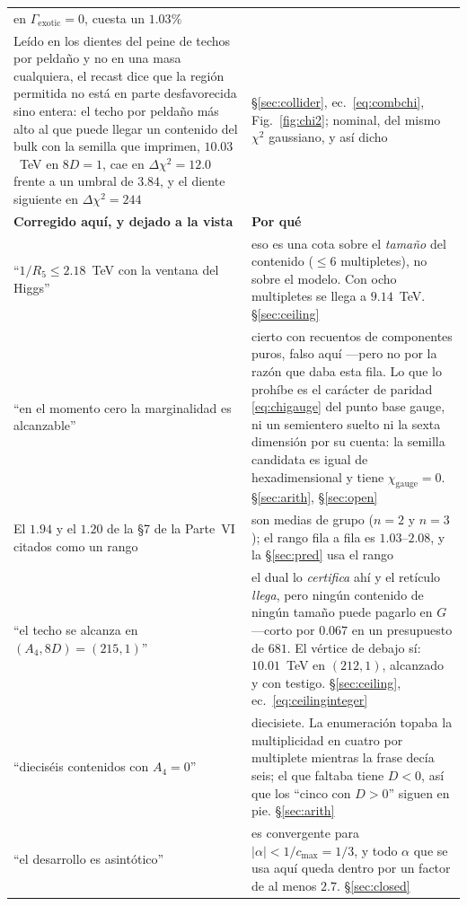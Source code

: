 \documentclass[11pt,a4paper]{article}
\begin{document}
\begin{longtable}{p{}p{}}
en $\Gamma_{\mathrm{exotic}}=0$, cuesta un $1.03\%$\\
Leído en los dientes del peine de techos por peldaño y no en una masa cualquiera, el recast dice que la
región permitida no está en parte desfavorecida sino entera: el techo por peldaño más alto al que
puede llegar un contenido del bulk con la semilla que \cite{KM25} imprimen, $10.03$~TeV en $8D=1$, cae en $\Delta\chi^2=12.0$ frente a un
umbral de $3.84$, y el diente siguiente en $\Delta\chi^2=244$ & \S\ref{sec:collider},
ec.~\eqref{eq:combchi}, Fig.~\ref{fig:chi2}; nominal, del mismo $\chi^2$ gaussiano, y así dicho\\
\midrule
\rowcolor{hdrblue!10}\textbf{Corregido aquí, y dejado a la vista} & \textbf{Por qué}\\
\midrule
``$1/R_5\le2.18$~TeV con la ventana del Higgs'' & eso es una cota sobre el \emph{tamaño} del
contenido ($\le6$ multipletes), no sobre el modelo. Con ocho multipletes se llega a $9.14$~TeV.
\S\ref{sec:ceiling}\\
``en el momento cero la marginalidad es alcanzable'' & cierto con recuentos de componentes puros,
falso aquí ---pero no por la razón que daba esta fila. Lo que lo prohíbe es el carácter de paridad
\eqref{eq:chigauge} del punto base gauge, ni un semientero suelto ni la sexta dimensión por su
cuenta: la semilla candidata es igual de hexadimensional y tiene $\chi_{\mathrm{gauge}}=0$.
\S\ref{sec:arith}, \S\ref{sec:open}\\
El $1.94$ y el $1.20$ de la \S7 de la Parte~VI citados como un rango & son medias de grupo ($n=2$ y
$n=3$); el rango fila a fila es $1.03$--$2.08$, y la \S\ref{sec:pred} usa el rango\\
``el techo se alcanza en $(A_4,8D)=(215,1)$'' & el dual lo \emph{certifica} ahí y el retículo
\emph{llega}, pero ningún contenido de ningún tamaño puede pagarlo en $G$ ---corto por $0.067$ en un
presupuesto de $681$. El vértice de debajo sí: $10.01$~TeV en $(212,1)$, alcanzado y con testigo.
\S\ref{sec:ceiling}, ec.~\eqref{eq:ceilinginteger}\\
``dieciséis contenidos con $A_4=0$'' & diecisiete. La enumeración topaba la multiplicidad en cuatro
por multiplete mientras la frase decía seis; el que faltaba tiene $D<0$, así que los ``cinco con
$D>0$'' siguen en pie. \S\ref{sec:arith}\\
``el desarrollo es asintótico'' & es convergente para $|\alpha|<1/c_{\max}=1/3$, y todo $\alpha$ que
se usa aquí queda dentro por un factor de al menos $2.7$. \S\ref{sec:closed}\\

\end{longtable}
\end{document}
